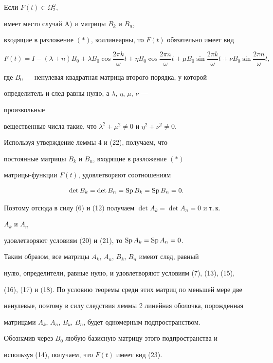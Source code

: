 \begin{thm} 


Если $F(t)\in\Omega^\omega_2$, 


имеет место случай $\mathrm A)$ и матрицы $B_k$ и $B_n$, 


входящие в разложение $(\ast)$, коллинеарны, то $F(t)$ обязательно имеет вид 


\begin{equation} 


F(t)=I-(\lambda+n)B_0+\lambda B_0\cos\frac{2\pi k}{\omega}t 


+\eta B_0\cos\frac{2\pi n}{\omega}t+\mu B_0\sin 


\frac{2\pi k}{\omega}t+\nu B_0\sin 


\frac{2\pi n}{\omega}t, 


\end{equation} 


где $B_0$ --- ненулевая квадратная матрица второго порядка, у которой


определитель и след равны нулю, а $\lambda$, $\eta$, $\mu$, $\nu$ --- 


произвольные 


вещественные числа такие, что $\lambda^2+\mu^2{\ne}0$ и $\eta^2+\nu^2{\ne}0$. 


\end{thm} 


 





\begin{pf} 


Используя утверждение леммы 4 и (22), получаем, что 


постоянные матрицы $B_k$ и $B_n$, входящие в разложение $(\ast)$ 


матрицы-функции $F(t)$, удовлетворяют соотношениям 


$$ 


\det B_k=\det B_n=\Sp B_k=\Sp B_n=0. 


$$ 


Поэтому отсюда в силу (6) и (12) получаем $\det A_k=\det A_n=0$ и т.\,к. 


$A_k$ и $A_n$ 


удовлетворяют условиям (20) и (21), то $\operatorname{Sp} A_k=\operatorname{Sp} A_n=0$. 


 


Таким образом, все матрицы $A_k$, $A_n$, $B_k$, $B_n$ имеют след, равный 


нулю, определители, равные нулю, и удовлетворяют условиям (7), (13), (15), 


(16), (17) и (18). По условию теоремы среди этих матриц по меньшей мере две 


ненулевые, поэтому в силу следствия леммы 2 линейная оболочка, порожденная 


матрицами $A_k$, $A_n$, $B_k$, $B_n$, будет одномерным подпространством. 


Обозначив через $B_0$ любую базисную матрицу этого подпространства и 


используя (14), получаем, что $F(t)$ имеет вид (23). 


\end{pf}


